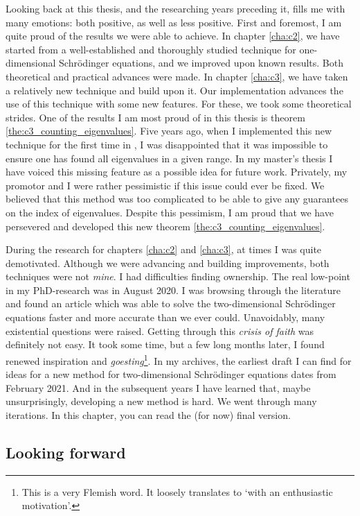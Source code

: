 Looking back at this thesis, and the researching years preceding it, fills me with many emotions: both positive, as well as less positive. First and foremost, I am quite proud of the results we were able to achieve. In chapter \ref{cha:c2}, we have started from a well-established and thoroughly studied technique for one-dimensional Schrödinger equations, and we improved upon known results. Both theoretical and practical advances were made. In chapter \ref{cha:c3}, we have taken a relatively new technique and build upon it. Our implementation advances the use of this technique with some new features. For these, we took some theoretical strides. One of the results I am most proud of in this thesis is theorem \ref{the:c3_counting_eigenvalues}. Five years ago, when I implemented this new technique for the first time in \matlab{}, I was disappointed that it was impossible to ensure one has found all eigenvalues in a given range. In my master's thesis I have voiced this missing feature as a possible idea for future work. Privately, my promotor and I were rather pessimistic if this issue could ever be fixed. We believed that this method was too complicated to be able to give any guarantees on the index of eigenvalues. Despite this pessimism, I am proud that we have persevered and developed this new theorem \ref{the:c3_counting_eigenvalues}.

During the research for chapters \ref{cha:c2} and \ref{cha:c3}, at times I was quite demotivated. Although we were advancing and building improvements, both techniques were not \emph{mine}. I had difficulties finding ownership. The real low-point in my PhD-research was in August 2020. I was browsing through the literature and found an article which was able to solve the two-dimensional Schrödinger equations faster and more accurate than we ever could. Unavoidably, many existential questions were raised. Getting through this \emph{crisis of faith} was definitely not easy. It took some time, but a few long months later, I found renewed inspiration and \emph{goesting}\footnote{This is a very Flemish word. It loosely translates to `with an enthusiastic motivation'.}. In my archives, the earliest draft I can find for ideas for a new method for two-dimensional Schrödinger equations dates from February 2021. And in the subsequent years I have learned that, maybe unsurprisingly, developing a new method is hard. We went through many iterations. In this chapter, you can read the (for now) final version.


\subsection{Looking forward}

